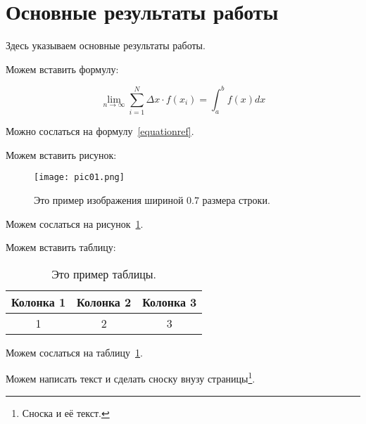 \section{Основные результаты работы}

Здесь указываем основные результаты работы.

Можем вставить формулу:

\begin{equation}
  \lim_{n\rightarrow\infty} \sum_{i=1}^{N} \Delta x \cdot f(x_i) = \int_a^b f(x) dx
  \label{equationref}
\end{equation}

Можно сослаться на формулу~\ref{equationref}.

Можем вставить рисунок:

\begin{figure}[H]
 \centering %
  \texttt{[image: pic01.png]}
  \caption{Это пример изображения шириной 0.7 размера строки.}
  \label{pictureref}  %
\end{figure}

Можем сослаться на рисунок~\ref{pictureref}.

Можем вставить таблицу:

\begin{table}[H]
  \centering
  \begin{tabular}{|c|c|c|}
   \hline
   Колонка 1  & Колонка 2 & Колонка 3 \\
   \hline
   1  & 2 & 3 \\
   \hline
  \end{tabular}
  \caption{Это пример таблицы.}
  \label{tableref}  %
\end{table}

Можем сослаться на таблицу~\ref{tableref}.

Можем написать текст и сделать сноску внузу страницы\footnote{Сноска и её текст.}.
